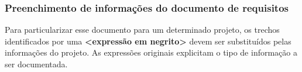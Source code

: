 \subsubsection{Preenchimento de informações do documento de requisitos}

Para particularizar esse documento para um determinado projeto, os trechos 
identificados por uma \textbf{<expressão em negrito>} devem ser substituídos 
pelas informações do projeto. As expressões originais explicitam o tipo de 
informação a ser documentada.


\newpage

